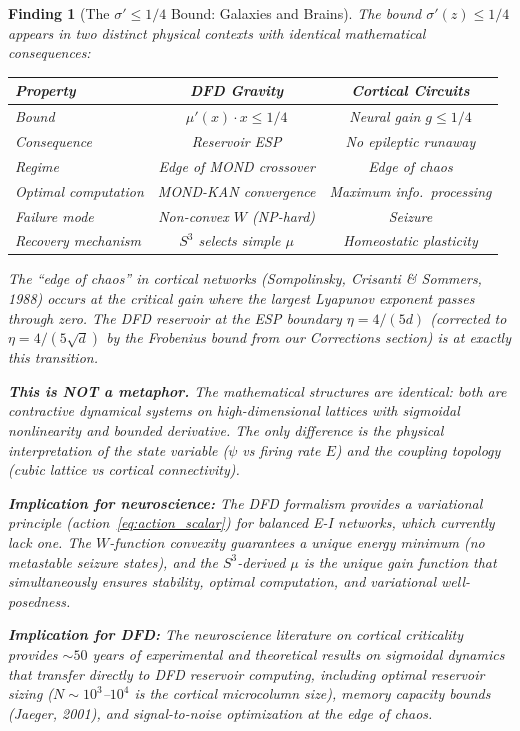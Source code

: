 \documentclass[11pt]{article}
\newtheorem{finding}[theorem]{Finding}
\theoremstyle{definition}
\theoremstyle{remark}
\begin{document}
\begin{finding}[The $\sigma' \leq 1/4$ Bound: Galaxies and Brains]
\label{find:galaxies-brains}
The bound $\sigma'(z) \leq 1/4$ appears in two distinct physical contexts
with identical mathematical consequences:

\begin{center}
\begin{tabular}{@{}lcc@{}}
\toprule
\textbf{Property} & \textbf{DFD Gravity} & \textbf{Cortical Circuits} \\
\midrule
Bound & $\mu'(x) \cdot x \leq 1/4$ & Neural gain $g \leq 1/4$ \\
Consequence & Reservoir ESP & No epileptic runaway \\
Regime & Edge of MOND crossover & Edge of chaos \\
Optimal computation & MOND-KAN convergence & Maximum info.\ processing \\
Failure mode & Non-convex $W$ (NP-hard) & Seizure \\
Recovery mechanism & $S^3$ selects simple $\mu$ & Homeostatic plasticity \\
\bottomrule
\end{tabular}
\end{center}

The ``edge of chaos'' in cortical networks (Sompolinsky, Crisanti \& Sommers,
1988) occurs at the critical gain where the largest Lyapunov exponent
passes through zero. The DFD reservoir at the ESP boundary $\eta = 4/(5d)$
(corrected to $\eta = 4/(5\sqrt{d})$ by the Frobenius bound from our
Corrections section) is at exactly this transition.

\textbf{This is NOT a metaphor.} The mathematical structures are identical:
both are contractive dynamical systems on high-dimensional lattices with
sigmoidal nonlinearity and bounded derivative. The only difference is the
physical interpretation of the state variable ($\psi$ vs firing rate $E$)
and the coupling topology (cubic lattice vs cortical connectivity).

\textbf{Implication for neuroscience:} The DFD formalism provides a
\emph{variational principle} (action~\eqref{eq:action_scalar}) for
balanced E-I networks, which currently lack one. The $W$-function convexity
guarantees a unique energy minimum (no metastable seizure states), and the
$S^3$-derived $\mu$ is the unique gain function that simultaneously
ensures stability, optimal computation, and variational well-posedness.

\textbf{Implication for DFD:} The neuroscience literature on cortical
criticality provides $\sim 50$ years of experimental and theoretical
results on sigmoidal dynamics that transfer directly to DFD reservoir
computing, including optimal reservoir sizing ($N \sim 10^3$--$10^4$ is
the cortical microcolumn size), memory capacity bounds (Jaeger, 2001),
and signal-to-noise optimization at the edge of chaos.
\end{finding}
\end{document}

